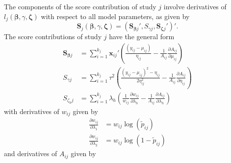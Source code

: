 \documentclass[
  american,
  man, donotrepeattitle,floatsintext]{apa7}
\begin{document}
The components of the score contribution of study \(j\) involve derivatives of \(l_{j}\left(\boldsymbol\beta, \gamma, \boldsymbol\zeta \right)\) with respect to all model parameters, as given by
\begin{equation}
\mathbf{S}_{j}\left(\boldsymbol{\beta}, \gamma, \boldsymbol{\zeta}\right) = \left(\mathbf{S}_{\boldsymbol\beta j}', S_{\gamma j}, \mathbf{S}_{\boldsymbol\zeta j}'\right)'.
\end{equation}
The score contributions of study \(j\) have the general form
\begin{align}
\mathbf{S}_{\boldsymbol\beta j} &= \sum_{i=1}^{k_j}  \mathbf{x}_{ij}' \left(\frac{\left(y_{ij} - \mu_{ij} \right)}{\eta_{ij}} - \frac{1}{A_{ij}}\frac{\partial A_{ij}}{\partial  \mu_{ij}}\right) \\
S_{\gamma j} &= \sum_{i=1}^{k_j} \tau^2 \left(\frac{\left(y_{ij} - \mu_{ij}\right)^2 - \eta_{ij}}{2\eta_{ij}^2} - \frac{1}{A_{ij}}\frac{\partial A_{ij}}{\partial \eta_{ij}}\right) \\
S_{\zeta_h j} &= \sum_{i=1}^{k_j} \lambda_h \left(\frac{1}{w_{ij}}\frac{\partial w_{ij}}{\partial \lambda_{h}} - \frac{1}{A_{ij}}\frac{\partial A_{ij}}{\partial \lambda_{h}}\right)
\end{align}
with derivatives of \(w_{ij}\) given by
\begin{align}
\frac{\partial w_{ij}}{\partial \lambda_1} &= w_{ij} \log(\tilde{p}_{ij}) \\
\frac{\partial w_{ij}}{\partial \lambda_2} &= w_{ij} \log(1 - \tilde{p}_{ij}) 
\end{align}
and derivatives of \(A_{ij}\) given by
\end{document}
